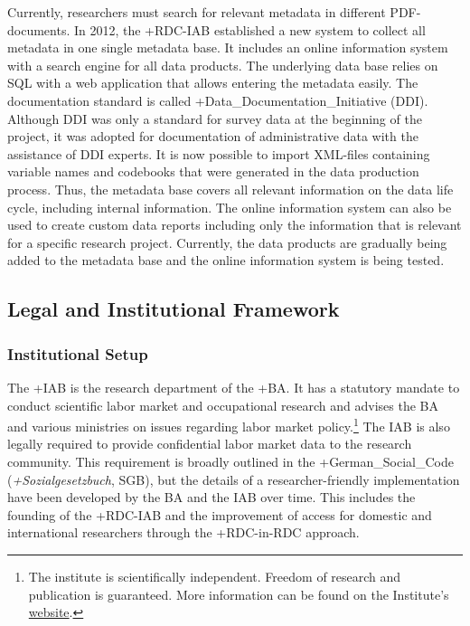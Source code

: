 \documentclass[
]{WileySix}
\begin{document}
Currently, researchers must search for relevant metadata in different PDF-documents. In 2012, the +RDC-IAB\textbar{} established a new system to collect all metadata in one single metadata base. It includes an online information system with a search engine for all data products. The underlying data base relies on SQL with a web application that allows entering the metadata easily. The documentation standard is called +Data\_Documentation\_Initiative\textbar{} (DDI). Although DDI was only a standard for survey data at the beginning of the project, it was adopted for documentation of administrative data with the assistance of DDI experts. It is now possible to import XML-files containing variable names and codebooks that were generated in the data production process. Thus, the metadata base covers all relevant information on the data life cycle, including internal information. The online information system can also be used to create custom data reports including only the information that is relevant for a specific research project. Currently, the data products are gradually being added to the metadata base and the online information system is being tested.

\hypertarget{legal-and-institutional-framework}{%
\subsection{Legal and Institutional Framework}\label{legal-and-institutional-framework}}

\hypertarget{institutional-setup}{%
\subsubsection{Institutional Setup}\label{institutional-setup}}

The +IAB\textbar{} is the research department of the +BA\textbar. It has a statutory mandate to conduct scientific labor market and occupational research and advises the BA and various ministries on issues regarding labor market policy.\footnote{The institute is scientifically independent. Freedom of research and publication is guaranteed. More information can be found on the Institute's \href{https://www.iab.de/en/iab-aktuell.aspx}{website}.} The IAB is also legally required to provide confidential labor market data to the research community. This requirement is broadly outlined in the +German\_Social\_Code\textbar{} (\emph{+Sozialgesetzbuch\textbar{}}, SGB), but the details of a researcher-friendly implementation have been developed by the BA and the IAB over time. This includes the founding of the +RDC-IAB\textbar{} and the improvement of access for domestic and international researchers through the +RDC-in-RDC\textbar{} approach.
\end{document}

